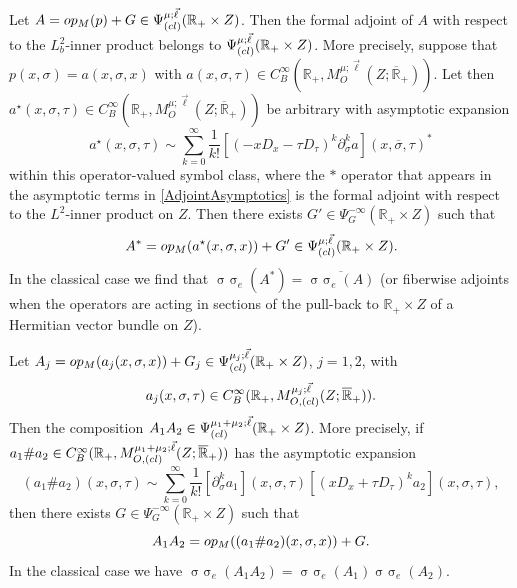 \documentclass[10pt,a4paper]{amsart}
\DeclareMathOperator{\sym}{ \sigma\!\!\!\sigma}
\def\R{\mathbb R}
\def\opm{\textup{op}_{\textit{M}}}
\begin{document}
\begin{theorem}\label{AdjointsCalculus}
Let $A = \opm(p) + G \in \Psi^{\mu;\vec{\ell}}_{\textup{(cl)}}(\R_+\times Z)$. Then the formal adjoint of $A$ with respect to the $L^2_b$-inner product belongs to $\Psi^{\mu;\vec{\ell}}_{\textup{(cl)}}(\R_+\times Z)$. More precisely, suppose that $p(x,\sigma) = a(x,\sigma,x)$ with $a(x,\sigma,\tau) \in C^{\infty}_B(\R_+,M^{\mu;\vec{\ell}}_O(Z;\overline{\R}_+))$. Let then $a^{\star}(x,\sigma,\tau)  \in C^{\infty}_B(\R_+,M^{\mu;\vec{\ell}}_O(Z;\overline{\R}_+))$ be arbitrary with asymptotic expansion
\begin{equation}\label{AdjointAsymptotics}
a^{\star}(x,\sigma,\tau) \sim \sum\limits_{k=0}^{\infty}\frac{1}{k!}[(-xD_x - \tau D_{\tau})^k\partial_{\sigma}^k a](x,\overline{\sigma},\tau)^*
\end{equation}
within this operator-valued symbol class, where the $*$ operator that appears in the asymptotic terms in \eqref{AdjointAsymptotics} is the formal adjoint with respect to the $L^2$-inner product on $Z$. Then there exists $G' \in \Psi^{-\infty}_G(\R_+\times Z)$ such that
$$
A^* = \opm(a^{\star}(x,\sigma,x) ) + G' \in \Psi^{\mu;\vec{\ell}}_{\textup{(cl)}}(\R_+\times Z).
$$
In the classical case we find that $\sym_e(A^*) = \overline{\sym_e(A)}$ (or fiberwise adjoints when the operators are acting in sections of the pull-back to $\R_+\times Z$ of a Hermitian vector bundle on $Z$).
\end{theorem}

\begin{theorem}\label{CompositionCalculus}
Let $A_j = \opm(a_j(x,\sigma,x)) + G_j \in \Psi^{\mu_j;\vec{\ell}}_{\textup{(cl)}}(\R_+\times Z)$, $j = 1,2$, with
$$
a_j(x,\sigma,\tau) \in C^{\infty}_B(\R_+,M^{\mu_j;\vec{\ell}}_{O,\textup{(cl)}}(Z;\overline{\R}_+)).
$$
Then the composition $A_1 A_2 \in \Psi^{\mu_1+\mu_2;\vec{\ell}}_{\textup{(cl)}}(\R_+\times Z)$. More precisely, if $a_1{\#}a_2 \in C^{\infty}_B(\R_+,M^{\mu_1+\mu_2;\vec{\ell}}_{O,\textup{(cl)}}(Z;\overline{\R}_+))$ has the asymptotic expansion
\begin{equation}\label{LeibnizAsymptotics}
(a_1{\#}a_2)(x,\sigma,\tau) \sim \sum\limits_{k=0}^{\infty}\frac{1}{k!}[\partial_{\sigma}^ka_1](x,\sigma,\tau)[(xD_x + \tau D_{\tau})^ka_2](x,\sigma,\tau),
\end{equation}
then there exists $G \in \Psi^{-\infty}_G(\R_+\times Z)$ such that
$$
A_1 A_2 = \opm((a_1{\#}a_2)(x,\sigma,x)) + G.
$$
In the classical case we have $\sym_e(A_1 A_2) = \sym_e(A_1)\sym_e(A_2)$.
\end{theorem}
\end{document}
